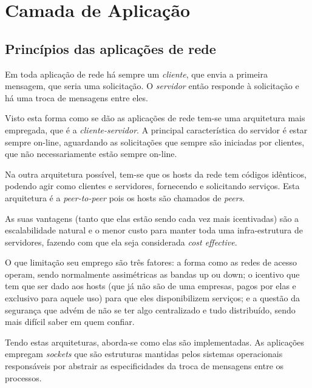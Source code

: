 \chapter{Camada de Aplicação}

\section{Princípios das aplicações de rede}

Em toda aplicação de rede há sempre um \emph{cliente}, que envia a primeira mensagem, que seria uma solicitação.
O \emph{servidor} então responde à solicitação e há uma troca de mensagens entre eles.

Visto esta forma como se dão as aplicações de rede tem-se uma arquitetura mais empregada, que é a \emph{cliente-servidor}.
A principal característica do servidor é estar sempre on-line, aguardando as solicitações que sempre são iniciadas por clientes, que não necessariamente estão sempre on-line.

Na outra arquitetura possível, tem-se que os hosts da rede tem códigos idênticos, podendo agir como clientes e servidores, fornecendo e solicitando serviços.
Esta arquitetura é a \emph{peer-to-peer} pois os hosts são chamados de \emph{peers}.

As suas vantagens (tanto que elas estão sendo cada vez mais icentivadas) são a escalabilidade natural e 
o menor custo para manter toda uma infra-estrutura de servidores, fazendo com que ela seja considerada \emph{cost effective}.

O que limitação seu emprego são três fatores: a forma como as redes de acesso operam, sendo normalmente assimétricas as bandas up ou down;
o icentivo que tem que ser dado aos hosts (que já não são de uma empresas, pagos por elas e exclusivo para aquele uso) para que eles disponibilizem serviços; e a questão da segurança que advém de não se ter algo centralizado e tudo distribuído, sendo mais difícil saber em quem confiar.

Tendo estas arquiteturas, aborda-se como elas são implementadas.
As aplicações empregam \emph{sockets} que são estruturas mantidas pelos sistemas operacionais responsáveis por abstrair as especificidades da troca de mensagens entre os processos.

